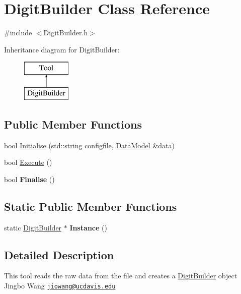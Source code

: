 \hypertarget{classDigitBuilder}{\section{Digit\-Builder Class Reference}
\label{classDigitBuilder}
}


{\ttfamily \#include $<$Digit\-Builder.\-h$>$}

Inheritance diagram for Digit\-Builder\-:\begin{figure}[H]
\begin{center}
\leavevmode
\includegraphics[height=2.000000cm]{classDigitBuilder}
\end{center}
\end{figure}
\subsection*{Public Member Functions}
\begin{DoxyCompactItemize}
\item 
bool \hyperlink{classDigitBuilder_aacb1cb36e5063ba4774381012ac148d6}{Initialise} (std\-::string configfile, \hyperlink{classDataModel}{Data\-Model} \&data)
\item 
bool \hyperlink{classDigitBuilder_a77c2d2d5208563e7a9d8f1a2c8a4777c}{Execute} ()
\item 
\hypertarget{classDigitBuilder_adfbdd3e33b7ac69a7be4bf54fd264066}{bool {\bfseries Finalise} ()}\label{classDigitBuilder_adfbdd3e33b7ac69a7be4bf54fd264066}

\end{DoxyCompactItemize}
\subsection*{Static Public Member Functions}
\begin{DoxyCompactItemize}
\item 
\hypertarget{classDigitBuilder_a3bffe9fa6444a64595122c859d00513d}{static \hyperlink{classDigitBuilder}{Digit\-Builder} $\ast$ {\bfseries Instance} ()}\label{classDigitBuilder_a3bffe9fa6444a64595122c859d00513d}

\end{DoxyCompactItemize}


\subsection{Detailed Description}
This tool reads the raw data from the file and creates a \hyperlink{classDigitBuilder}{Digit\-Builder} object Jingbo Wang \href{mailto:jiowang@ucdavis.edu}{\tt jiowang@ucdavis.\-edu} 

